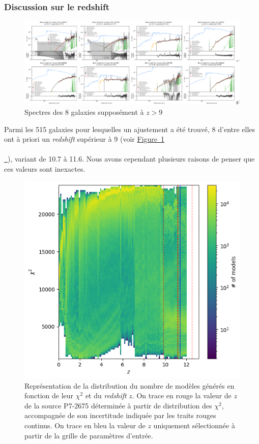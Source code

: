 \documentclass[12pt, a4paper]{article}
\newcommand*{\figref}[2][]{%
  \hyperref[{#2}]{%
    Figure~\ref*{#2}%
    \ifx\\#1\\%
    \else
      \,#1%
    \fi
  }%
}
\begin{document}
\subsubsection{Discussion sur le redshift}

\begin{figure}[!h]
  \centering
  \includegraphics[width=1.1\textwidth]{assets/high_redshift_models.png}
  \caption{Spectres des 8 galaxies supposément à $z > 9$}
  \label{fig:high_redshift}
\end{figure}

Parmi les 515 galaxies pour lesquelles un ajustement a été trouvé, 8 d'entre elles ont à priori un \textit{redshift} supérieur à 9 (voir \figref{fig:high_redshift}), variant de 10.7 à 11.6. Nous avons cependant plusieurs raisons de penser que ces valeurs sont inexactes.

\begin{figure}[!h]
  \centering
  \includegraphics[scale=0.5]{assets/chi2_high_redshift.png}
  \caption{Représentation de la distribution du nombre de modèles générés en fonction de leur $\chi^2$ et du \textit{redshift} $z$. On trace en rouge la valeur de $z$ de la source P7-2675 déterminée à partir de distribution des $\chi^2$, accompagnée de son incertitude indiquée par les traits rouges continus. On trace en bleu la valeur de $z$ uniquement sélectionnée à partir de la grille de paramètres d'entrée.}
  \label{fig:chi2}
\end{figure}
\end{document}
